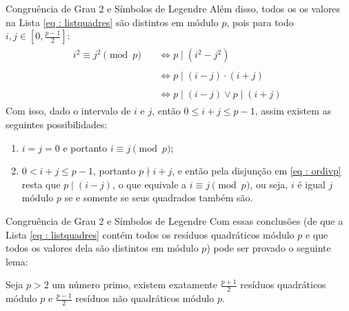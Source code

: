 \begin{frame}[fragile]{Congruência de Grau 2 e Símbolos de Legendre}
    Além disso, todos os os valores na Lista \ref{eq : listquadres} são distintos em módulo $p$, pois para todo $i, j \in \left[0, \frac{p-1}{2}\right]$:
    \begin{align}
        i^2 \equiv j^2 \pmod p
        &\begin{aligned}
            \;\; \Longleftrightarrow p \mid (i^2- j^2)
        \end{aligned} \\
        &\begin{aligned}
            \;\; \Longleftrightarrow p \mid (i -j)\cdot(i + j)
        \end{aligned} \\
        &\begin{aligned} \label{eq : ordivp}
            \;\; \Longleftrightarrow p \mid (i -j) \lor p \mid (i + j)
        \end{aligned}
    \end{align}
    Com isso, dado o intervalo de $i$ e $j$, então $0 \leq i + j \leq p - 1$, assim existem as seguintes possibilidades:
        \begin{enumerate}
            \item $i = j = 0$ e portanto $i \equiv j \pmod p$;
            \item $0 < i + j \leq p-1$, portanto $p \nmid i + j$, e então pela disjunção em \ref{eq : ordivp} resta que $p \mid (i - j)$, o que equivale a $i \equiv j \pmod p$, ou seja, $i$ é igual $j$ módulo $p$ se e somente se seus quadrados também são.
        \end{enumerate}
\end{frame}

\begin{frame}[fragile]{Congruência de Grau 2 e Símbolos de Legendre}
    Com essas conclusões (de que a Lista \ref{eq : listquadres} contém todos os resíduos quadráticos módulo $p$ e que todos os valores dela são distintos em módulo $p$) pode ser provado o seguinte lema:
        \begin{lema} \label{lema:existnonquadratic}
            Seja $p > 2$ um número primo, existem exatamente $\frac{p+1}{2}$ resíduos quadráticos módulo $p$ e $\frac{p-1}{2}$ resíduos não quadráticos módulo $p$.
        \end{lema}
\end{frame}

